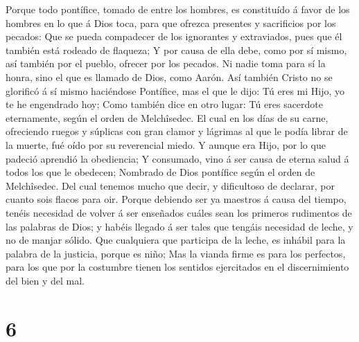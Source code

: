  Porque todo pontífice, tomado de entre los hombres, es
constituído á favor de los hombres en lo que á Dios toca, para que
ofrezca presentes y sacrificios por los pecados:  Que se
pueda compadecer de los ignorantes y extraviados, pues que él también
está rodeado de flaqueza;  Y por causa de ella debe, como
por sí mismo, así también por el pueblo, ofrecer por los pecados.
 Ni nadie toma para sí la honra, sino el que es llamado de
Dios, como Aarón.  Así también Cristo no se glorificó á sí
mismo haciéndose Pontífice, mas el que le dijo: Tú eres mi Hijo, yo te
he engendrado hoy;  Como también dice en otro lugar: Tú
eres sacerdote eternamente, según el orden de Melchîsedec.
 El cual en los días de su carne, ofreciendo ruegos y
súplicas con gran clamor y lágrimas al que le podía librar de la muerte,
fué oído por su reverencial miedo.  Y aunque era Hijo, por
lo que padeció aprendió la obediencia;  Y consumado, vino
á ser causa de eterna salud á todos los que le obedecen; 
Nombrado de Dios pontífice según el orden de Melchîsedec.
 Del cual tenemos mucho que decir, y dificultoso de
declarar, por cuanto sois flacos para oir.  Porque
debiendo ser ya maestros á causa del tiempo, tenéis necesidad de volver
á ser enseñados cuáles sean los primeros rudimentos de las palabras de
Dios; y habéis llegado á ser tales que tengáis necesidad de leche, y no
de manjar sólido.  Que cualquiera que participa de la
leche, es inhábil para la palabra de la justicia, porque es niño;
 Mas la vianda firme es para los perfectos, para los que
por la costumbre tienen los sentidos ejercitados en el discernimiento
del bien y del mal.

\hypertarget{section-5}{%
\section{6}\label{section-5}}

